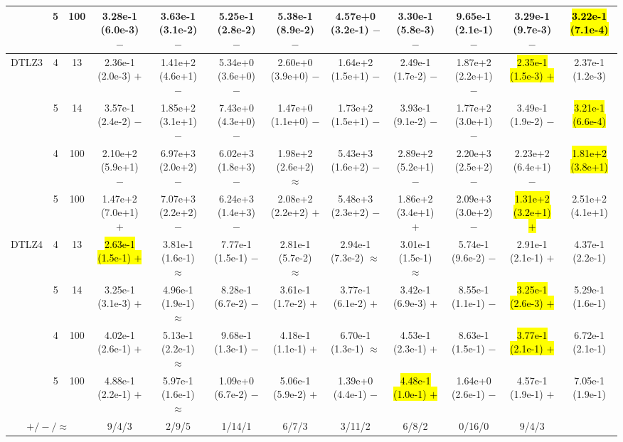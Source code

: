 \begin{table}
{\begin{tabular}{cccccccccccc}
& 5 & 100
& 3.28e-1 (6.0e-3) $-$
& 3.63e-1 (3.1e-2) $-$
& 5.25e-1 (2.8e-2) $-$
& 5.38e-1 (8.9e-2) $-$
& 4.57e+0 (3.2e-1) $-$
& 3.30e-1 (5.8e-3) $-$
& 9.65e-1 (2.1e-1) $-$
& 3.29e-1 (9.7e-3) $-$
& \hl{3.22e-1 (7.1e-4)} \\

\midrule

\multirow{4}{*}{DTLZ3}
& 4 & 13
& 2.36e-1 (2.0e-3) $+$
& 1.41e+2 (4.6e+1) $-$
& 5.34e+0 (3.6e+0) $-$
& 2.60e+0 (3.9e+0) $-$
& 1.64e+2 (1.5e+1) $-$
& 2.49e-1 (1.7e-2) $-$
& 1.87e+2 (2.2e+1) $-$
& \hl{2.35e-1 (1.5e-3) $+$}
& 2.37e-1 (1.2e-3) \\

& 5 & 14
& 3.57e-1 (2.4e-2) $-$
& 1.85e+2 (3.1e+1) $-$
& 7.43e+0 (4.3e+0) $-$
& 1.47e+0 (1.1e+0) $-$
& 1.73e+2 (1.5e+1) $-$
& 3.93e-1 (9.1e-2) $-$
& 1.77e+2 (3.0e+1) $-$
& 3.49e-1 (1.9e-2) $-$
& \hl{3.21e-1 (6.6e-4)} \\

& 4 & 100
& 2.10e+2 (5.9e+1) $-$
& 6.97e+3 (2.0e+2) $-$
& 6.02e+3 (1.8e+3) $-$
& 1.98e+2 (2.6e+2) $\approx$
& 5.43e+3 (1.6e+2) $-$
& 2.89e+2 (5.2e+1) $-$
& 2.20e+3 (2.5e+2) $-$
& 2.23e+2 (6.4e+1) $-$
& \hl{1.81e+2 (3.8e+1)} \\

& 5 & 100
& 1.47e+2 (7.0e+1) $+$
& 7.07e+3 (2.2e+2) $-$
& 6.24e+3 (1.4e+3) $-$
& 2.08e+2 (2.2e+2) $+$
& 5.48e+3 (2.3e+2) $-$
& 1.86e+2 (3.4e+1) $+$
& 2.09e+3 (3.0e+2) $-$
& \hl{1.31e+2 (3.2e+1) $+$}
& 2.51e+2 (4.1e+1) \\

\midrule

\multirow{4}{*}{DTLZ4}
& 4 & 13
& \hl{2.63e-1 (1.5e-1) $+$}
& 3.81e-1 (1.6e-1) $\approx$
& 7.77e-1 (1.5e-1) $-$
& 2.81e-1 (5.7e-2) $\approx$
& 2.94e-1 (7.3e-2) $\approx$
& 3.01e-1 (1.5e-1) $\approx$
& 5.74e-1 (9.6e-2) $-$
& 2.91e-1 (2.1e-1) $+$
& 4.37e-1 (2.2e-1) \\

& 5 & 14
& 3.25e-1 (3.1e-3) $+$
& 4.96e-1 (1.9e-1) $\approx$
& 8.28e-1 (6.7e-2) $-$
& 3.61e-1 (1.7e-2) $+$
& 3.77e-1 (6.1e-2) $+$
& 3.42e-1 (6.9e-3) $+$
& 8.55e-1 (1.1e-1) $-$
& \hl{3.25e-1 (2.6e-3) $+$}
& 5.29e-1 (1.6e-1) \\

& 4 & 100
& 4.02e-1 (2.6e-1) $+$
& 5.13e-1 (2.2e-1) $\approx$
& 9.68e-1 (1.3e-1) $-$
& 4.18e-1 (1.1e-1) $+$
& 6.70e-1 (1.3e-1) $\approx$
& 4.53e-1 (2.3e-1) $+$
& 8.63e-1 (1.5e-1) $-$
& \hl{3.77e-1 (2.1e-1) $+$}
& 6.72e-1 (2.1e-1) \\

& 5 & 100
& 4.88e-1 (2.2e-1) $+$
& 5.97e-1 (1.6e-1) $\approx$
& 1.09e+0 (6.7e-2) $-$
& 5.06e-1 (5.9e-2) $+$
& 1.39e+0 (4.4e-1) $-$
& \hl{4.48e-1 (1.0e-1) $+$}
& 1.64e+0 (2.6e-1) $-$
& 4.57e-1 (1.9e-1) $+$
& 7.05e-1 (1.9e-1) \\

\midrule
\multicolumn{3}{c}{$+/-/\approx$}
& 9/4/3 & 2/9/5 & 1/14/1 & 6/7/3 & 3/11/2 & 6/8/2 & 0/16/0 & 9/4/3 & \\
\bottomrule
\end{tabular}%
}
\end{table}
